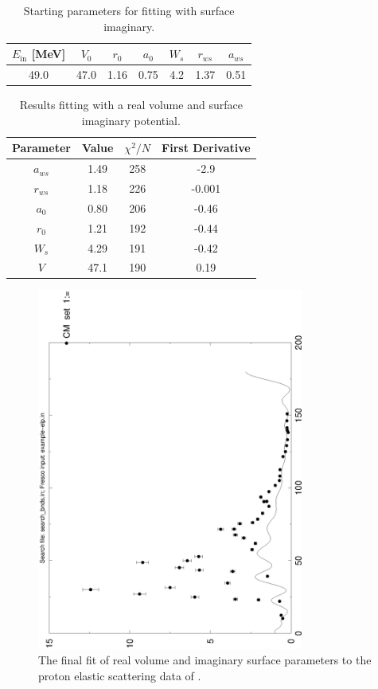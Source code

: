 \documentclass[]{scrartcl}
\begin{document}
\begin{table}
\centering
	\begin{tabular}{ c | c c c | c c c  }
	$E _{\mathrm{in}}$ [MeV] & $ V _0$ & $ r _0$ & $ a _0$ & $W_s$ & $ r _{ws} $ & $ a _{ws} $\\
\hline
	49.0 &  47.0 &  1.16 &  0.75  &  4.2 & 1.37 &  0.51\\
\hline
	\end{tabular}
	\caption{Starting parameters for fitting with surface imaginary.}
	\label{tab:init}
\end{table}


\begin{table}
\centering
	\begin{tabular}{ c | c | c c }
	Parameter & Value & $\chi ^2 / N$ & First Derivative\\
\hline
	$a _{ws}$ & 1.49 & 258 & -2.9\\
	$r _{ws}$ & 1.18 & 226 & -0.001\\
	$a _0$ & 0.80 & 206 & -0.46\\
	$r _0$ & 1.21 & 192 & -0.44\\
	$W_s$ & 4.29 & 191 & -0.42\\
	$V$ & 47.1 & 190 & 0.19\\
\hline
	\end{tabular}
	\caption{Results fitting with a real volume and surface imaginary potential.}
	\label{tab:fitsurf}
\end{table}

\begin{figure}
\centering
	\includegraphics[width=0.78\textwidth,angle=270]{plots/searchS1.eps}
	\caption{The final fit of real volume and imaginary surface parameters to the proton elastic scattering data of \citep{Sinha1972}.}
	\label{fig:fit2}
\end{figure}
\end{document}
